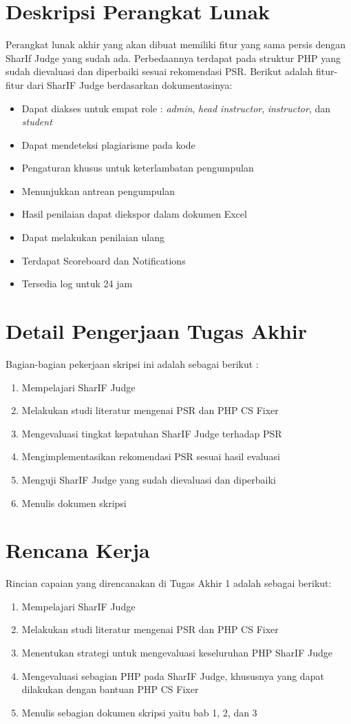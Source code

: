 \documentclass[a4paper,twoside]{article}
\begin{document}
	\section{Deskripsi Perangkat Lunak}
	Perangkat lunak akhir yang akan dibuat memiliki fitur yang sama persis dengan SharIf Judge yang sudah ada. Perbedaannya terdapat pada struktur PHP yang sudah dievaluasi dan diperbaiki sesuai rekomendasi  PSR. Berikut adalah fitur-fitur dari SharIF Judge berdasarkan dokumentasinya:
	\begin{itemize}
		\item Dapat diakses untuk empat role : \textit{admin}, \textit{head instructor}, \textit{instructor}, dan \textit{student}
		\item Dapat mendeteksi plagiarisme pada kode
		\item Pengaturan khusus untuk keterlambatan pengumpulan
		\item Menunjukkan antrean pengumpulan
		\item Hasil penilaian dapat diekspor dalam dokumen Excel
		\item Dapat melakukan penilaian ulang
		\item Terdapat Scoreboard dan Notifications
		\item Tersedia log untuk 24 jam 
	\end{itemize}
	
	\section{Detail Pengerjaan Tugas Akhir}
	Bagian-bagian pekerjaan skripsi ini adalah sebagai berikut :
	\begin{enumerate}
		\item Mempelajari SharIF Judge 
		\item Melakukan studi literatur mengenai PSR dan PHP CS Fixer
		\item Mengevaluasi tingkat kepatuhan SharIF Judge terhadap PSR
		\item Mengimplementasikan rekomendasi PSR sesuai hasil evaluasi
		\item Menguji SharIF Judge yang sudah dievaluasi dan diperbaiki
		\item Menulis dokumen skripsi
	\end{enumerate}
	
	\section{Rencana Kerja}
	Rincian capaian yang direncanakan di Tugas Akhir 1 adalah sebagai berikut:
	\begin{enumerate}
		\item Mempelajari SharIF Judge
		\item Melakukan studi literatur mengenai PSR dan PHP CS Fixer
		\item Menentukan strategi untuk mengevaluasi keseluruhan PHP SharIF Judge
		\item Mengevaluasi sebagian PHP pada SharIF Judge, khususnya yang dapat dilakukan dengan bantuan PHP CS Fixer
		\item Menulis sebagian dokumen skripsi yaitu bab 1, 2, dan 3
	\end{enumerate}
	
\end{document}
